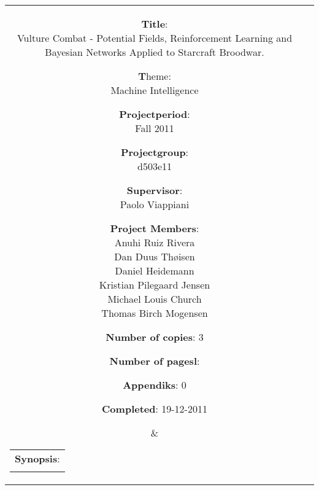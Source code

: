 	\begin{tabular}{cc}
		\parbox[0.1cm]{7cm}{ %
			\begin{description}
				\item {\textbf{Title}:} \\
					Vulture Combat - Potential Fields, Reinforcement Learning and Bayesian Networks Applied to Starcraft Broodwar.
				\item {\textbf Theme:} \\
					Machine Intelligence
 			\end{description}

			\parbox{8cm}{ %
				\begin{description}
					\item {\textbf{Projectperiod}:}\\
					Fall 2011\\
					\hspace{4cm}
					\item {\textbf{Projectgroup}:}\\
					d503e11\\
					\hspace{4cm}
					\item {\textbf{Supervisor}:}\\
					Paolo Viappiani \\
					\item {\textbf{Project Members}:}\\ \newcommand{\sh}{18pt} %
					Anuhi Ruiz Rivera \\
					Dan Duus Thøisen \\
					Daniel Heidemann \\
					Kristian Pilegaard Jensen \\
					Michael Louis Church \\
					Thomas Birch Mogensen \\
				\end{description}
			}
			\begin{description}
				\item {\textbf{Number of copies}:} 3
				\item {\textbf{Number of pagesl}:} \pageref{LastPage}
				\item {\textbf{Appendiks}:} 0
				\item {\textbf{Completed}:} 19-12-2011
			\end{description}
			\vfill 
		} &
		\parbox{7cm}{ %
			\hfill %
			\begin{tabular}{l}%
				{\textbf{Synopsis}:}\bigskip \\%
				\fbox{ %
					\parbox{6.5cm}{\bigskip %
					{\vfill{\small %
					 
						\bigskip}}%
					}}%
			\end{tabular}%
		}
	\end{tabular}
	\\ \\

